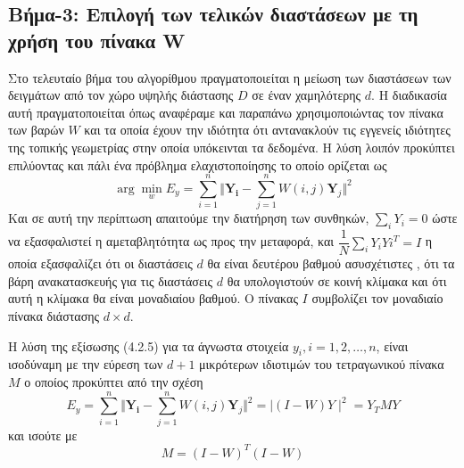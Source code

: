 \subsection{Βήμα-3: Επιλογή των τελικών διαστάσεων με τη χρήση του πίνακα \textlatin{W}}
\par
Στο τελευταίο βήμα του αλγορίθμου πραγματοποιείται η μείωση των διαστάσεων των δειγμάτων από τον χώρο υψηλής διάστασης $D$ σε έναν χαμηλότερης $d$. Η διαδικασία αυτή πραγματοποιείται όπως αναφέραμε και παραπάνω χρησιμοποιώντας τον πίνακα των βαρών $W$ και τα οποία έχουν την ιδιότητα ότι αντανακλούν τις εγγενείς ιδιότητες της τοπικής γεωμετρίας στην οποία υπόκεινται τα δεδομένα. Η λύση λοιπόν προκύπτει επιλύοντας και πάλι ένα πρόβλημα ελαχιστοποίησης το οποίο ορίζεται ως
\newline\hspace*{\fill}
\begin{equation}
        \arg \min_{w} E_{y} = \sum_{i=1}^{n} \Vert \mathbf{Y_{i}} - \sum_{j=1}^{n} W(i,j)\mathbf{Y}_{j} \Vert ^{2}
\end{equation}
\hspace*{\fill}\newline
Και σε αυτή την περίπτωση  απαιτούμε την διατήρηση των συνθηκών, $\sum_{i} Y_{i} = 0$ ώστε να εξασφαλιστεί η αμεταβλητότητα ως προς την μεταφορά, και $ \dfrac{1}{N} \sum_{i} Y_{i}Y{i}^{T} = I $ η οποία εξασφαλίζει ότι οι διαστάσεις $d$ θα είναι δευτέρου βαθμού ασυσχέτιστες , ότι τα βάρη ανακατασκευής για τις διαστάσεις $d$ θα υπολογιστούν σε κοινή κλίμακα και ότι αυτή η κλίμακα θα είναι μοναδιαίου βαθμού. Ο πίνακας $I$ συμβολίζει τον μοναδιαίο πίνακα διάστασης $d \times d$. 
\par
Η λύση της εξίσωσης (4.2.5) για τα άγνωστα στοιχεία $y_{i},i=1,2,\ldots,n$, είναι ισοδύναμη με την εύρεση των $d+1$ μικρότερων ιδιοτιμών του τετραγωνικού πίνακα $M$ ο οποίος προκύπτει από την σχέση
\newline\hspace*{\fill}
\begin{equation}
        E_{y} = \sum_{i=1}^{n} \Vert \mathbf{Y_{i}} - \sum_{j=1}^{n} W(i,j)\mathbf{Y}_{j} \Vert ^{2} = \mid (I-W)Y \mid ^{2} = Y_{T}MY
\end{equation}
\hspace*{\fill}\newline
και ισούτε με
\begin{equation}
        M = (I-W)^{T}(I-W)
\end{equation}
\hspace*{\fill}\newline
